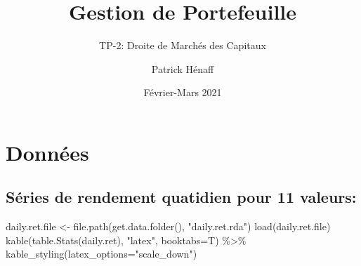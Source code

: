 \documentclass[
]{article}
\title{Gestion de Portefeuille}
\subtitle{TP-2: Droite de Marchés des Capitaux}
\author{Patrick Hénaff}
\date{Février-Mars 2021}
\newenvironment{Shaded}{\begin{snugshade}}{\end{snugshade}}
\newcommand{\AttributeTok}[1]{\textcolor[rgb]{0.77,0.63,0.00}{#1}}
\newcommand{\FunctionTok}[1]{\textcolor[rgb]{0.00,0.00,0.00}{#1}}
\newcommand{\NormalTok}[1]{#1}
\newcommand{\OtherTok}[1]{\textcolor[rgb]{0.56,0.35,0.01}{#1}}
\newcommand{\SpecialCharTok}[1]{\textcolor[rgb]{0.00,0.00,0.00}{#1}}
\newcommand{\StringTok}[1]{\textcolor[rgb]{0.31,0.60,0.02}{#1}}
\begin{document}
\maketitle

\hypertarget{donnuxe9es}{%
\section{Données}\label{donnuxe9es}}

\hypertarget{suxe9ries-de-rendement-quatidien-pour-11-valeurs}{%
\subsection{Séries de rendement quatidien pour 11
valeurs:}\label{suxe9ries-de-rendement-quatidien-pour-11-valeurs}}

\begin{Shaded}
\begin{Highlighting}[]
\NormalTok{daily.ret.file }\OtherTok{\textless{}{-}} \FunctionTok{file.path}\NormalTok{(}\FunctionTok{get.data.folder}\NormalTok{(), }\StringTok{"daily.ret.rda"}\NormalTok{)}
\FunctionTok{load}\NormalTok{(daily.ret.file)}
\FunctionTok{kable}\NormalTok{(}\FunctionTok{table.Stats}\NormalTok{(daily.ret), }\StringTok{"latex"}\NormalTok{, }\AttributeTok{booktabs=}\NormalTok{T) }\SpecialCharTok{\%\textgreater{}\%} \FunctionTok{kable\_styling}\NormalTok{(}\AttributeTok{latex\_options=}\StringTok{"scale\_down"}\NormalTok{)}
\end{Highlighting}
\end{Shaded}
\end{document}
